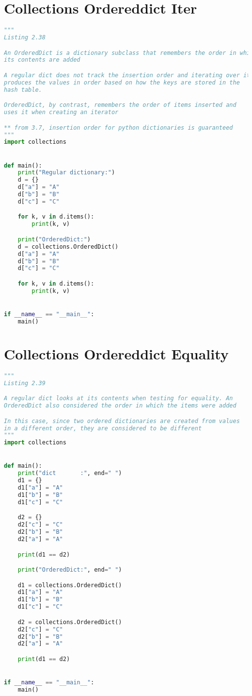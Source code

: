 \documentclass[a4paper,landscape]{report}
\begin{document}
\section{Collections Ordereddict Iter}
\begin{lstlisting}[language=Python]
"""
Listing 2.38

An OrderedDict is a dictionary subclass that remembers the order in which
its contents are added

A regular dict does not track the insertion order and iterating over it
produces the values in order based on how the keys are stored in the
hash table.

OrderedDict, by contrast, remembers the order of items inserted and
uses it when creating an iterator

** from 3.7, insertion order for python dictionaries is guaranteed
"""
import collections


def main():
    print("Regular dictionary:")
    d = {}
    d["a"] = "A"
    d["b"] = "B"
    d["c"] = "C"

    for k, v in d.items():
        print(k, v)

    print("OrderedDict:")
    d = collections.OrderedDict()
    d["a"] = "A"
    d["b"] = "B"
    d["c"] = "C"

    for k, v in d.items():
        print(k, v)


if __name__ == "__main__":
    main()

\end{lstlisting}
\section{Collections Ordereddict Equality}
\begin{lstlisting}[language=Python]
"""
Listing 2.39

A regular dict looks at its contents when testing for equality. An
OrderedDict also considered the order in which the items were added

In this case, since two ordered dictionaries are created from values
in a different order, they are considered to be different
"""
import collections


def main():
    print("dict       :", end=" ")
    d1 = {}
    d1["a"] = "A"
    d1["b"] = "B"
    d1["c"] = "C"

    d2 = {}
    d2["c"] = "C"
    d2["b"] = "B"
    d2["a"] = "A"

    print(d1 == d2)

    print("OrderedDict:", end=" ")

    d1 = collections.OrderedDict()
    d1["a"] = "A"
    d1["b"] = "B"
    d1["c"] = "C"

    d2 = collections.OrderedDict()
    d2["c"] = "C"
    d2["b"] = "B"
    d2["a"] = "A"

    print(d1 == d2)


if __name__ == "__main__":
    main()

\end{lstlisting}
\end{document}
